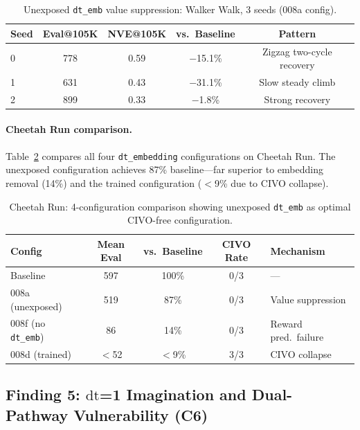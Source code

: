 \documentclass{article}
\newcommand{\dt}{\mathrm{dt}}
\begin{document}
\begin{table}[h]
\centering
\caption{Unexposed \texttt{dt\_emb} value suppression: Walker Walk, 3 seeds (008a config).}
\label{tab:008a-seeds}
\begin{tabular}{lcccc}
\toprule
\textbf{Seed} & \textbf{Eval@105K} & \textbf{NVE@105K} & \textbf{vs.\ Baseline} & \textbf{Pattern} \\
\midrule
0 & 778 & 0.59 & $-$15.1\% & Zigzag two-cycle recovery \\
1 & 631 & 0.43 & $-$31.1\% & Slow steady climb \\
2 & 899 & 0.33 & $-$1.8\% & Strong recovery \\
\bottomrule
\end{tabular}
\end{table}

\paragraph{Cheetah Run comparison.}
Table~\ref{tab:cheetah-configs} compares all four \texttt{dt\_embedding} configurations on Cheetah Run.
The unexposed configuration achieves 87\% baseline---far superior to embedding removal (14\%) and the trained configuration ($<$9\% due to CIVO collapse).

\begin{table}[h]
\centering
\caption{Cheetah Run: 4-configuration comparison showing unexposed \texttt{dt\_emb} as optimal CIVO-free configuration.}
\label{tab:cheetah-configs}
\begin{tabular}{lcccl}
\toprule
\textbf{Config} & \textbf{Mean Eval} & \textbf{vs.\ Baseline} & \textbf{CIVO Rate} & \textbf{Mechanism} \\
\midrule
Baseline & 597 & 100\% & 0/3 & --- \\
008a (unexposed) & 519 & 87\% & 0/3 & Value suppression \\
008f (no \texttt{dt\_emb}) & 86 & 14\% & 0/3 & Reward pred.\ failure \\
008d (trained) & $<$52 & $<$9\% & 3/3 & CIVO collapse \\
\bottomrule
\end{tabular}
\end{table}

\subsection{Finding 5: $\dt$=1 Imagination and Dual-Pathway Vulnerability (C6)}
\label{sec:c6}
\end{document}
